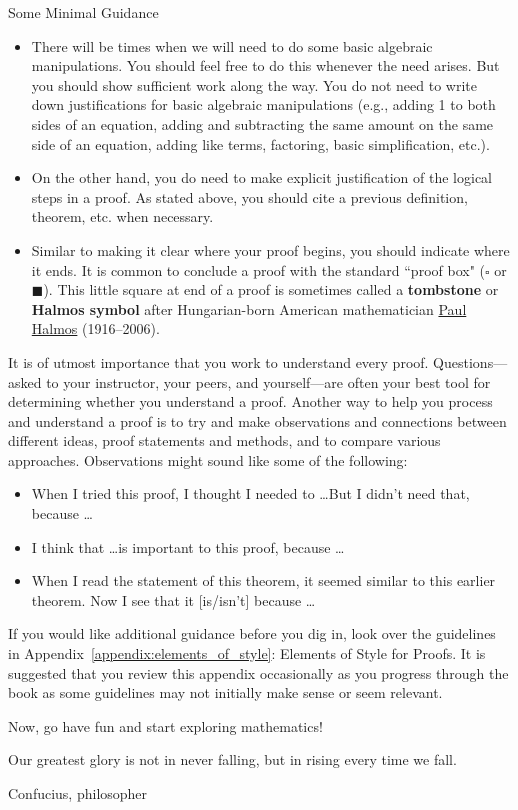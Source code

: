 \begin{section}{Some Minimal Guidance}
\begin{itemize}
\item There will be times when we will need to do some basic algebraic manipulations.  You should feel free to do this whenever the need arises.  But you should show sufficient work along the way.  You do not need to write down justifications for basic algebraic manipulations (e.g., adding 1 to both sides of an equation, adding and subtracting the same amount on the same side of an equation, adding like terms, factoring, basic simplification, etc.).  
\item On the other hand, you do need to make explicit justification of the logical steps in a proof.  As stated above, you should cite a previous definition, theorem, etc. when necessary.
\item Similar to making it clear where your proof begins, you should indicate where it ends.  It is common to conclude a proof with the standard ``proof box" ($\square$ or $\blacksquare$).  This little square at end of a proof is sometimes called a \textbf{tombstone} or \textbf{Halmos symbol} after Hungarian-born American mathematician \href{https://en.wikipedia.org/wiki/Paul_Halmos}{Paul Halmos} (1916--2006).
\end{itemize}

It is of utmost importance that you work to understand every proof.  Questions---asked to your instructor, your peers, and yourself---are often your best tool for determining whether you understand a proof.  Another way to help you process and understand a proof is to try and make observations and connections between different ideas, proof statements and methods, and to compare various approaches. Observations might sound like some of the following:
\begin{itemize}
\item When I tried this proof, I thought I needed to \ldots But I didn't need that, because \ldots
\item I think that \ldots is important to this proof, because \ldots
\item When I read the statement of this theorem, it seemed similar to this earlier theorem. Now I see that it [is/isn't] because \ldots
\end{itemize}

If you would like additional guidance before you dig in, look over the guidelines in Appendix~\ref{appendix:elements_of_style}: Elements of Style for Proofs. It is suggested that you review this appendix occasionally as you progress through the book as some guidelines may not initially make sense or seem relevant. 

Now, go have fun and start exploring mathematics!

\epigraph{Our greatest glory is not in never falling, but in rising every time we fall.}{Confucius, philosopher}

\end{section}